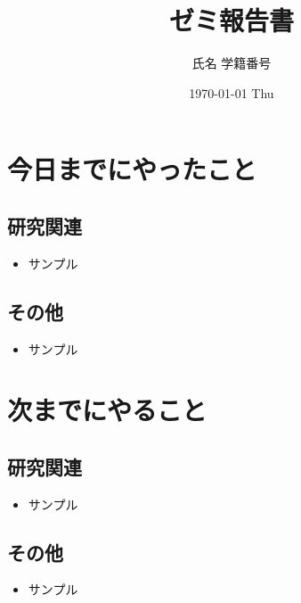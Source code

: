 \documentclass[uplatex, onecolumn, 10pt]{jsarticle}
\begin{document}
\title{\vspace{-40mm}\bf{\LARGE{ゼミ報告書}}}
\author{\vspace{-40mm}氏名 学籍番号}
\date{1970-01-01 Thu}
\maketitle


\section{今日までにやったこと}

\subsection*{研究関連} 
\begin{itemize}
	\item サンプル
\end{itemize}

\subsection*{その他}
\begin{itemize}
	\item サンプル
\end{itemize}


\section{次までにやること}

\subsection*{研究関連}
\begin{itemize}
	\item サンプル
\end{itemize}

\subsection*{その他}
\begin{itemize}
    \item サンプル
\end{itemize}
\end{document}
